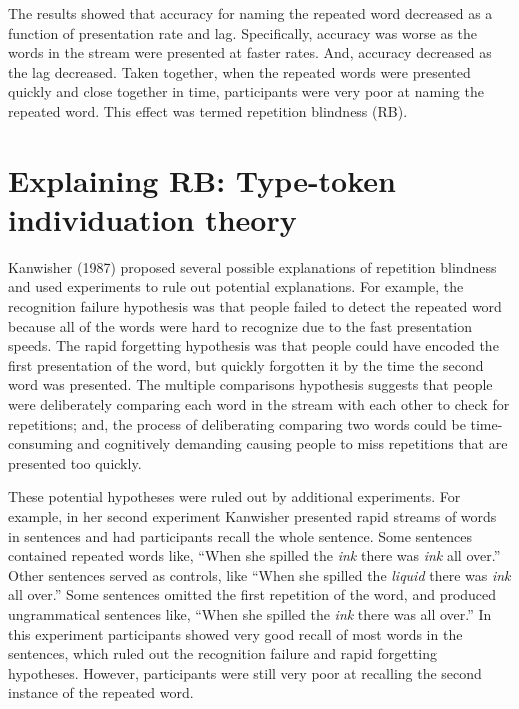 \documentclass[
  man,floatsintext]{apa6}
\begin{document}
The results showed that accuracy for naming the repeated word decreased as a function of presentation rate and lag. Specifically, accuracy was worse as the words in the stream were presented at faster rates. And, accuracy decreased as the lag decreased. Taken together, when the repeated words were presented quickly and close together in time, participants were very poor at naming the repeated word. This effect was termed repetition blindness (RB).

\hypertarget{explaining-rb-type-token-individuation-theory}{%
\section{Explaining RB: Type-token individuation theory}\label{explaining-rb-type-token-individuation-theory}}

Kanwisher (1987) proposed several possible explanations of repetition blindness and used experiments to rule out potential explanations. For example, the recognition failure hypothesis was that people failed to detect the repeated word because all of the words were hard to recognize due to the fast presentation speeds. The rapid forgetting hypothesis was that people could have encoded the first presentation of the word, but quickly forgotten it by the time the second word was presented. The multiple comparisons hypothesis suggests that people were deliberately comparing each word in the stream with each other to check for repetitions; and, the process of deliberating comparing two words could be time-consuming and cognitively demanding causing people to miss repetitions that are presented too quickly.

These potential hypotheses were ruled out by additional experiments. For example, in her second experiment Kanwisher presented rapid streams of words in sentences and had participants recall the whole sentence. Some sentences contained repeated words like, ``When she spilled the \emph{ink} there was \emph{ink} all over.'' Other sentences served as controls, like ``When she spilled the \emph{liquid} there was \emph{ink} all over.'' Some sentences omitted the first repetition of the word, and produced ungrammatical sentences like, ``When she spilled the \emph{ink} there was all over.'' In this experiment participants showed very good recall of most words in the sentences, which ruled out the recognition failure and rapid forgetting hypotheses. However, participants were still very poor at recalling the second instance of the repeated word.
\end{document}
